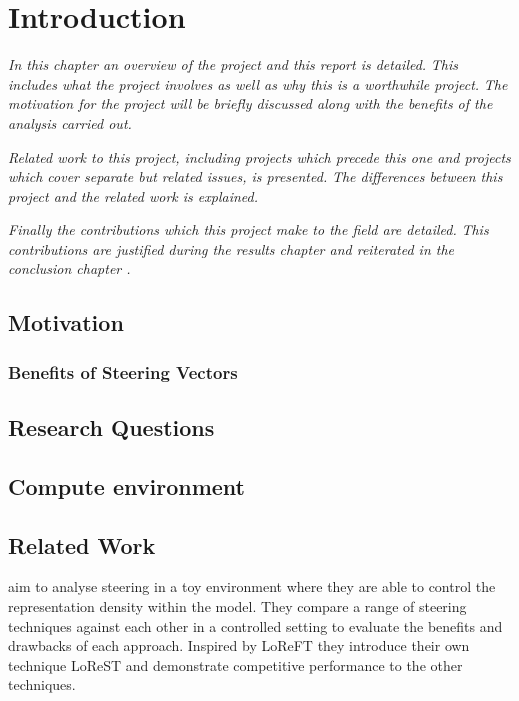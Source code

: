 \chapter{Introduction}
\label{ch:introduction}

\emph{In this chapter an overview of the project and this report is detailed.}
\emph{This includes what the project involves as well as why this is a worthwhile project.}
\emph{The motivation for the project will be briefly discussed along with the benefits of the analysis carried out.}

\emph{Related work to this project, including projects which precede this one and projects which cover separate but related issues, is presented.}
\emph{The differences between this project and the related work is explained.}

\emph{Finally the contributions which this project make to the field are detailed.}
\emph{This contributions are justified during the results chapter  and reiterated in the conclusion chapter .}

\section{Motivation}

\subsection{Benefits of Steering Vectors}

\section{Research Questions}

\section{Compute environment}

\section{Related Work}

aim to analyse steering in a toy environment where they are able to control the representation density within the model.
They compare a range of steering techniques \citep{caa, reft, mimic} against each other in a controlled setting to evaluate the benefits and drawbacks of each approach.
Inspired by LoReFT \citep{reft} they introduce their own technique LoReST and demonstrate competitive performance to the other techniques.

